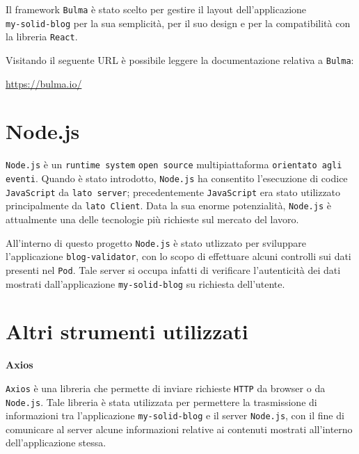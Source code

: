 \bigskip

Il framework {\tt Bulma} è stato scelto per gestire il layout dell'applicazione\\{\tt my-solid-blog} per la sua semplicità, per il suo design e per la compatibilità con la libreria {\tt React}.

\medskip

Visitando il seguente URL è possibile leggere la documentazione relativa a {\tt Bulma}:

\smallskip

\href{https://bulma.io/}{https://bulma.io/}

\bigskip

\section{Node.js}

\medskip

{\tt Node.js} è un {\tt runtime system} {\tt open source} multipiattaforma {\tt orientato agli eventi}. Quando è stato introdotto, {\tt Node.js} ha consentito l'esecuzione di codice {\tt JavaScript} da {\tt lato server}; precedentemente {\tt JavaScript} era stato utilizzato principalmente da {\tt lato Client}. Data la sua enorme potenzialità, {\tt Node.js} è attualmente una delle tecnologie più richieste sul mercato del lavoro.

\bigskip

All'interno di questo progetto {\tt Node.js} è stato utlizzato per sviluppare l'applicazione {\tt blog-validator}, con lo scopo di effettuare alcuni controlli sui dati presenti nel {\tt Pod}. Tale server si occupa infatti di verificare l'autenticità dei dati mostrati dall'applicazione {\tt my-solid-blog} su richiesta dell'utente.

\clearpage

\section{Altri strumenti utilizzati}

\bigskip

\textbf{Axios}

\bigskip

{\tt Axios} è una libreria che permette di inviare richieste {\tt HTTP} da browser o da {\tt Node.js}. Tale libreria è stata utilizzata per permettere la trasmissione di informazioni tra l'applicazione {\tt my-solid-blog} e il server {\tt Node.js}, con il fine di comunicare al server alcune informazioni relative ai contenuti mostrati all'interno dell'applicazione stessa.

